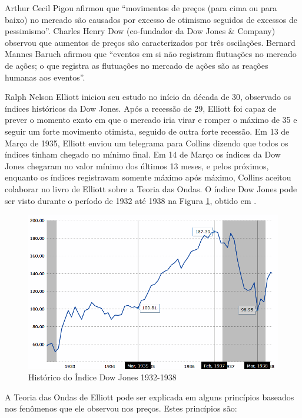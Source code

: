 \documentclass[12pt]{article}
\begin{document}
Arthur Cecil Pigou afirmou que ``movimentos de preços (para cima ou para baixo)
no mercado são causados por excesso de otimismo seguidos de excessos de pessimismo''.
Charles Henry Dow (co-fundador da Dow Jones \& Company) observou que aumentos de preços
são caracterizados por três oscilações. Bernard Mannes Baruch afirmou que ``eventos em si
não registram flutuações no mercado de ações; o que registra as flutuações no mercado de
ações são as reações humanas aos eventos''.

Ralph Nelson Elliott iniciou seu estudo no início da década de 30, observado os índices
históricos da Dow Jones. Após a recessão de 29, Elliott foi capaz de prever o momento exato em
que o mercado iria virar e romper o máximo de 35 e seguir um forte movimento otimista,
seguido de outra forte recessão. Em 13 de Março de 1935, Elliott enviou um telegrama para
Collins dizendo que todos os índices tinham chegado no mínimo final. Em 14 de Março os índices
da Dow Jones chegaram no valor mínimo dos últimos 13 meses, e pelos próximos, enquanto os
índices registravam somente máximo após máximo, Collins aceitou colaborar no livro de Elliott
\cite{Elliott:1938} sobre a Teoria das Ondas. O índice Dow Jones pode ser visto durante o
período de 1932 até 1938 na Figura \ref{fig:DowJones_history}, obtido em \cite{DowJonesHistory}.

\begin{figure}[H]
	\centering
	\includegraphics[width=\textwidth]{DowJones_history.png}
	\caption{Histórico do Índice Dow Jones 1932-1938}\label{fig:DowJones_history}
\end{figure}

A Teoria das Ondas de Elliott pode ser explicada em alguns princípios baseados nos fenômenos
que ele observou nos preços. Estes princípios são:
\end{document}
